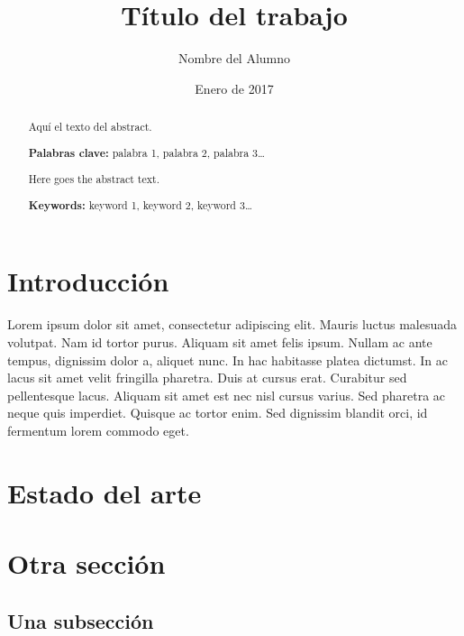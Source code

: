 \documentclass[a4paper, 12pt]{article} %
\author{Nombre del Alumno}
\date{Enero de 2017}
\title{Título del trabajo}
\begin{document}
\maketitle
\null%
\newpage

\tableofcontents
\newpage

\listoffigures
\listoftables
\newpage

\begin{abstract}
  \normalsize
  Aquí el texto del abstract.

  \textbf{Palabras clave:} palabra 1, palabra 2, palabra 3\ldots
\end{abstract}

\begin{otherlanguage}{english}
  \begin{abstract}
    \normalsize
    Here goes the abstract text.

    \textbf{Keywords:} keyword 1, keyword 2, keyword 3\ldots
  \end{abstract}
\end{otherlanguage}

\newpage
{} %

\section{Introducción}

Lorem ipsum dolor sit amet, consectetur adipiscing elit. Mauris luctus malesuada
volutpat. Nam id tortor purus. Aliquam sit amet felis ipsum. Nullam ac ante
tempus, dignissim dolor a, aliquet nunc. In hac habitasse platea dictumst. In ac
lacus sit amet velit fringilla pharetra. Duis at cursus erat. Curabitur sed
pellentesque lacus. Aliquam sit amet est nec nisl cursus varius. Sed pharetra ac
neque quis imperdiet. Quisque ac tortor enim. Sed dignissim blandit orci, id
fermentum lorem commodo eget\cite{Recos}.

\section{Estado del arte}

\section{Otra sección}

\subsection{Una subsección}
\end{document}
